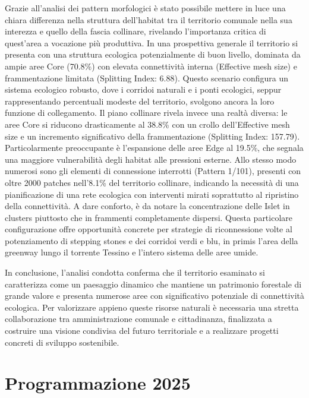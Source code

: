 \documentclass[
  a4paper,
]{book}
\begin{document}
Grazie all'analisi dei pattern morfologici è stato possibile mettere in luce una chiara differenza nella struttura dell'habitat tra il territorio comunale nella sua interezza e quello della fascia collinare, rivelando l'importanza critica di quest'area a vocazione più produttiva. In una prospettiva generale il territorio si presenta con una struttura ecologica potenzialmente di buon livello, dominata da ampie aree Core (70.8\%) con elevata connettività interna (Effective mesh size) e frammentazione limitata (Splitting Index: 6.88). Questo scenario configura un sistema ecologico robusto, dove i corridoi naturali e i ponti ecologici, seppur rappresentando percentuali modeste del territorio, svolgono ancora la loro funzione di collegamento. Il piano collinare rivela invece una realtà diversa: le aree Core si riducono drasticamente al 38.8\% con un crollo dell'Effective mesh size e un incremento significativo della frammentazione (Splitting Index: 157.79). Particolarmente preoccupante è l'espansione delle aree Edge al 19.5\%, che segnala una maggiore vulnerabilità degli habitat alle pressioni esterne. Allo stesso modo numerosi sono gli elementi di connessione interrotti (Pattern 1/101), presenti con oltre 2000 patches nell'8.1\% del territorio collinare, indicando la necessità di una pianificazione di una rete ecologica con interventi mirati soprattutto al ripristino della connettività. A dare conforto, è da notare la concentrazione delle Islet in clusters piuttosto che in frammenti completamente dispersi. Questa particolare configurazione offre opportunità concrete per strategie di riconnessione volte al potenziamento di stepping stones e dei corridoi verdi e blu, in primis l'area della greenway lungo il torrente Tessino e l'intero sistema delle aree umide.

In conclusione, l'analisi condotta conferma che il territorio esaminato si caratterizza come un paesaggio dinamico che mantiene un patrimonio forestale di grande valore e presenta numerose aree con significativo potenziale di connettività ecologica. Per valorizzare appieno queste risorse naturali è necessaria una stretta collaborazione tra amministrazione comunale e cittadinanza, finalizzata a costruire una visione condivisa del futuro territoriale e a realizzare progetti concreti di sviluppo sostenibile.

\chapter{Programmazione 2025}\label{programmazione-2025}
\end{document}
